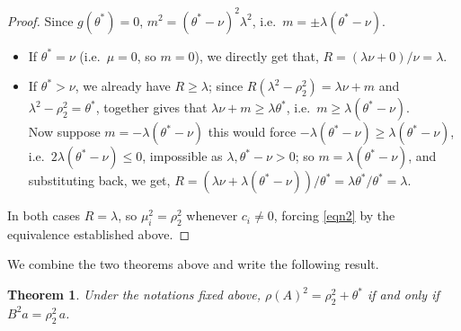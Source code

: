 \documentclass[12pt]{article}
\theoremstyle{plain}
\newtheorem{theorem}{Theorem}[section]
\numberwithin{equation}{section}
\begin{document}
\begin{proof}
		Since $g(\theta^*)=0$, $m^2=(\theta^*-\nu)^2\lambda^2$, i.e.\
		$m=\pm\lambda(\theta^*-\nu)$.
		\begin{itemize}
			\item If $\theta^*=\nu$ (i.e.\ $\mu=0$, so $m=0$), we directly get that,
			$R=(\lambda\nu+0)/\nu=\lambda$.
			\item If $\theta^*>\nu$, we already have $R\ge\lambda$; since
			$R(\lambda^2-\rho_2^2)=\lambda\nu+m$ and $\lambda^2-\rho_2^2=\theta^*$, together gives that $\lambda\nu+m\ge\lambda\theta^*$, i.e.\ $m\ge\lambda(\theta^*-\nu)$.\\
			Now suppose
			$m=-\lambda(\theta^*-\nu)$ this would force
			$-\lambda(\theta^*-\nu)\ge\lambda(\theta^*-\nu)$, i.e.\
			$2\lambda(\theta^*-\nu)\le0$, impossible as $\lambda,\theta^*-\nu>0$; so
			$m=\lambda(\theta^*-\nu)$, and substituting back, we get,
			$R=(\lambda\nu+\lambda(\theta^*-\nu))/\theta^*=\lambda\theta^*/\theta^*=\lambda$.
		\end{itemize}
		In both cases $R=\lambda$, so  $\mu_i^2=\rho_2^2$ whenever $c_i \neq 0$,
		forcing \eqref{eqn2} by the equivalence established above.
	\end{proof}
	
	We combine the two theorems above and write the following result.
	\begin{theorem}\label{matrix_eq}
		Under the notations fixed above, $\rho(A)^2=\rho_2^2+\theta^* $ if and only if 
		$B^2a=\rho_2^2\,a$.
		
	\end{theorem}
	
\end{document}
